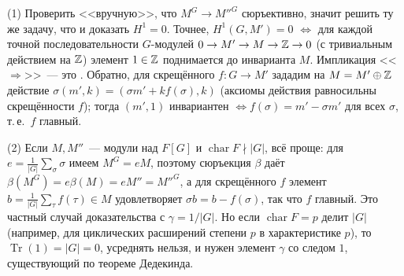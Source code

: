 \begin{remark}
(1) Проверить <<вручную>>, что $M^G\to M''^G$ сюръективно, значит решить ту же задачу, что и доказать $H^1=0$. Точнее,
$H^1(G,M')=0$ $\iff$ для каждой точной последовательности $G$-модулей $0\to M'\to M\to\mathbb Z\to0$ (с тривиальным действием
на $\mathbb Z$) элемент $1\in\mathbb Z$ поднимается до инварианта $M$. Импликация <<$\Rightarrow$>>~--- это . Обратно, для
скрещённого $f\colon G\to M'$ зададим на $M=M'\oplus\mathbb Z$ действие $\sigma(m',k)=(\sigma m'+kf(\sigma),k)$ (аксиомы
действия равносильны скрещённости $f$); тогда $(m',1)$ инвариантен $\iff f(\sigma)=m'-\sigma m'$ для всех $\sigma$, т.\,е.\
$f$ главный.

(2) Если $M,M''$~--- модули над $F[G]$ и $\operatorname{char}F\nmid|G|$, всё проще: для $e=\frac1{|G|}\sum_\sigma\sigma$
имеем $M^G=eM$, поэтому сюръекция $\beta$ даёт $\beta(M^G)=e\beta(M)=eM''=M''^G$, а для скрещённого $f$ элемент
$b=\frac1{|G|}\sum_\tau f(\tau)\in M$ удовлетворяет $\sigma b=b-f(\sigma)$, так что $f$ главный. Это частный случай
доказательства \rf{5.23a} с $\gamma=1/|G|$. Но если $\operatorname{char}F=p$ делит $|G|$ (например, для циклических
расширений степени $p$ в характеристике $p$), то $\operatorname{Tr}(1)=|G|=0$, усреднять нельзя, и нужен элемент $\gamma$ со следом
$1$, существующий по теореме Дедекинда.
\end{remark}

